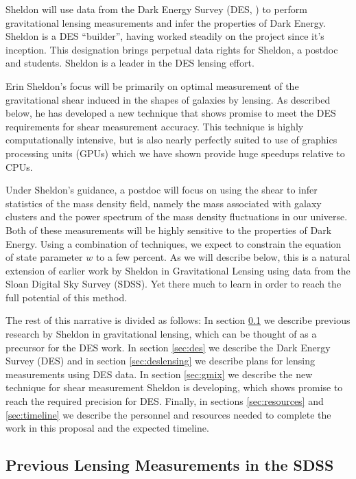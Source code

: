 \documentclass[12pt]{article}
\begin{document}
Sheldon will use data from the Dark Energy Survey (DES, \cite{DESWhitePaper})
to perform gravitational lensing measurements and infer the properties of Dark
Energy.  Sheldon is a DES ``builder'', having worked steadily on the project
since it's inception.  This designation brings perpetual data rights for
Sheldon, a postdoc and students.  Sheldon is a leader in the DES lensing
effort.  

Erin Sheldon's focus will be primarily on optimal measurement of the
gravitational shear induced in the shapes of galaxies by lensing. As described
below, he has developed a new technique that shows promise to meet the DES
requirements for shear measurement accuracy.  This technique is highly
computationally intensive, but is also nearly perfectly suited to use of
graphics processing units (GPUs) which we have shown provide huge speedups
relative to CPUs.

Under Sheldon's guidance, a postdoc will focus on using the shear to infer
statistics of the mass density field, namely the mass associated with galaxy
clusters and the power spectrum of the mass density fluctuations in our
universe. Both of these measurements will be highly sensitive to the properties
of Dark Energy.  Using a combination of techniques, we expect to constrain the
equation of state parameter $w$ to a few percent.  As we will describe below,
this is a natural extension of earlier work by Sheldon in Gravitational Lensing
using data from the Sloan Digital Sky Survey (SDSS).  Yet there much to learn
in order to reach the full potential of this method.

The rest of this narrative is divided as follows: In section \ref{sec:sdssold}
we describe previous research by Sheldon in gravitational lensing, which can be
thought of as a precursor for the DES work.  In section \ref{sec:des} we
describe the Dark Energy Survey (DES) and in section \ref{sec:deslensing} we
describe plans for lensing measurements using DES data.  In section
\ref{sec:gmix} we describe the new technique for shear measurement Sheldon is
developing, which shows promise to reach the required precision for DES. 
Finally, in sections \ref{sec:resources} and \ref{sec:timeline} we describe the
personnel and resources needed to complete the work in this proposal and the
expected timeline.


\subsection{Previous Lensing Measurements in the SDSS} \label{sec:sdssold}
\end{document}
